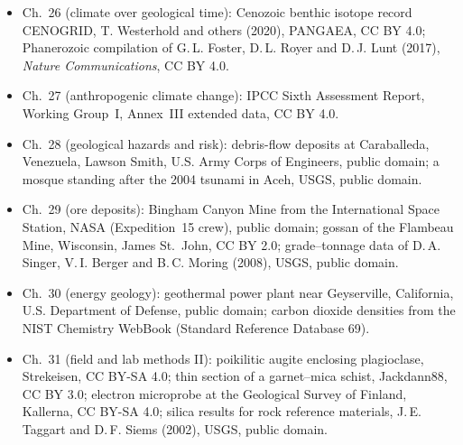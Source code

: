 \begin{itemize}
  \item Ch.~26 (climate over geological time): Cenozoic benthic isotope record CENOGRID, T. Westerhold and others (2020), PANGAEA, CC BY 4.0; Phanerozoic  compilation of G.\,L. Foster, D.\,L. Royer and D.\,J. Lunt (2017), \emph{Nature Communications}, CC BY 4.0.
  \item Ch.~27 (anthropogenic climate change): IPCC Sixth Assessment Report, Working Group~I, Annex~III extended data, CC BY 4.0.
  \item Ch.~28 (geological hazards and risk): debris-flow deposits at Caraballeda, Venezuela, Lawson Smith, U.S. Army Corps of Engineers, public domain; a mosque standing after the 2004 tsunami in Aceh, USGS, public domain.
  \item Ch.~29 (ore deposits): Bingham Canyon Mine from the International Space Station, NASA (Expedition~15 crew), public domain; gossan of the Flambeau Mine, Wisconsin, James St.~John, CC BY 2.0; grade--tonnage data of D.\,A. Singer, V.\,I. Berger and B.\,C. Moring (2008), USGS, public domain.
  \item Ch.~30 (energy geology): geothermal power plant near Geyserville, California, U.S. Department of Defense, public domain; carbon dioxide densities from the NIST Chemistry WebBook (Standard Reference Database 69).
  \item Ch.~31 (field and lab methods II): poikilitic augite enclosing plagioclase, Strekeisen, CC BY-SA 4.0; thin section of a garnet--mica schist, Jackdann88, CC BY 3.0; electron microprobe at the Geological Survey of Finland, Kallerna, CC BY-SA 4.0; silica results for rock reference materials, J.\,E. Taggart and D.\,F. Siems (2002), USGS, public domain.
\end{itemize}

